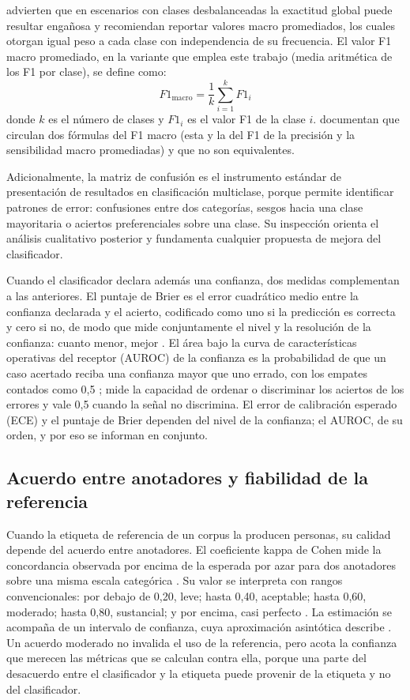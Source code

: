 \textcite{Sokolova2009_performance_measures} advierten que en escenarios con clases desbalanceadas la exactitud global puede resultar engañosa y recomiendan reportar valores macro promediados, los cuales otorgan igual peso a cada clase con independencia de su frecuencia. El valor F1 macro promediado, en la variante que emplea este trabajo (media aritmética de los F1 por clase), se define como:
\[
F1_{\text{macro}} = \frac{1}{k} \sum_{i=1}^{k} F1_{i}
\]
donde \(k\) es el número de clases y \(F1_{i}\) es el valor F1 de la clase \(i\). \textcite{Opitz2019_macro_f1} documentan que circulan dos fórmulas del F1 macro (esta y la del F1 de la precisión y la sensibilidad macro promediadas) y que no son equivalentes.

Adicionalmente, la matriz de confusión es el instrumento estándar de presentación de resultados en clasificación multiclase, porque permite identificar patrones de error: confusiones entre dos categorías, sesgos hacia una clase mayoritaria o aciertos preferenciales sobre una clase. Su inspección orienta el análisis cualitativo posterior y fundamenta cualquier propuesta de mejora del clasificador.

Cuando el clasificador declara además una confianza, dos medidas complementan a las anteriores. El puntaje de Brier es el error cuadrático medio entre la confianza declarada y el acierto, codificado como uno si la predicción es correcta y cero si no, de modo que mide conjuntamente el nivel y la resolución de la confianza: cuanto menor, mejor \parencite{Brier1950_verification}. El área bajo la curva de características operativas del receptor (AUROC) de la confianza es la probabilidad de que un caso acertado reciba una confianza mayor que uno errado, con los empates contados como 0,5 \parencite{Sokolova2009_performance_measures}; mide la capacidad de ordenar o discriminar los aciertos de los errores y vale 0,5 cuando la señal no discrimina. El error de calibración esperado (ECE) y el puntaje de Brier dependen del nivel de la confianza; el AUROC, de su orden, y por eso se informan en conjunto.

\subsection{Acuerdo entre anotadores y fiabilidad de la referencia}\label{subsec:acuerdo-anotadores}

Cuando la etiqueta de referencia de un corpus la producen personas, su calidad depende del acuerdo entre anotadores. El coeficiente kappa de Cohen mide la concordancia observada por encima de la esperada por azar para dos anotadores sobre una misma escala categórica \parencite{Cohen1960_kappa}. Su valor se interpreta con rangos convencionales: por debajo de 0,20, leve; hasta 0,40, aceptable; hasta 0,60, moderado; hasta 0,80, sustancial; y por encima, casi perfecto \parencite{Landis1977_kappa}. La estimación se acompaña de un intervalo de confianza, cuya aproximación asintótica describe \textcite{Fleiss1969_large_sample}. Un acuerdo moderado no invalida el uso de la referencia, pero acota la confianza que merecen las métricas que se calculan contra ella, porque una parte del desacuerdo entre el clasificador y la etiqueta puede provenir de la etiqueta y no del clasificador.

